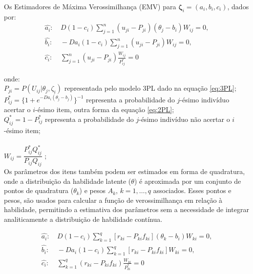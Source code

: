 Os Estimadores de Máxima Verossimilhança (EMV) para $ \boldsymbol{\zeta}_i = (a_i, b_i , c_i )$, dados por:\\


\[
\begin{aligned}
	\hat{a_i}: & \ D(1 - c_i)\sum_{j=1}^{n}(u_{ji} - P_{ji})(\theta_j - b_i)W_{ij} = 0, \\
	\hat{b_i}: & \ -Da_i(1 - c_i)\sum_{j=1}^{n}(u_{ji} - P_{ji})W_{ij} = 0, \\
	\hat{c_i}: & \ \sum_{j=1}^{n}(u_{ji} - P_{ji})\frac{W_{ij}}{P^*_{ij}} = 0
\end{aligned}
\]

\noindent onde:\\

\noindent $P_{ji} = P(U_{ij}|\theta_j,\zeta_i)$ representada pelo modelo 3PL dado na equação \ref{eq:3PL};\\

\noindent $P^*_{ij} = \{1 + e^{-Da_i(\theta_j - b_j)}\}^{-1} $ representa a probabilidade do $j$-ésimo indivíduo acertar o $i$-ésimo item, outra forma da equação \ref{eq:2PL};\\

\noindent $Q^*_{ij} = 1 - P^*_{ij} $ representa a probabilidade do $j$-ésimo indivíduo não acertar o $i$-ésimo item;\\
\\
\noindent $W_{ij} = \dfrac{P^*_{ij}Q^*_{ij}}{P_{ij}Q_{ij}} $ ;\\

Os parâmetros dos itens também podem ser estimados em forma de quadratura, onde a distribuição da habilidade latente ($\theta$) é aproximada por um conjunto de pontos de quadratura ($\theta_k$)  e pesos $A_k$, $k = 1, \dots, q$ associados. Esses pontos e pesos,  são usados para calcular a função de verossimilhança em relação à habilidade, permitindo a estimativa dos parâmetros sem a necessidade de integrar analiticamente a distribuição de habilidade contínua.

\[
\begin{aligned}
	\hat{a_i}: & \ D(1 - c_i)\sum_{k=1}^{q}[r_{ki} - P_{ki}f_{ki}](\theta_k - b_i)W_{ki} = 0, \\
	\hat{b_i}: & \ -Da_i(1 - c_i)\sum_{k=1}^{q}\left[r_{ki} - P_{ki}f_{ki}\right]W_{ki} = 0, \\
	\hat{c_i}: & \ \sum_{k=1}^{q}(r_{ki} - P_{ki}f_{ki})\frac{W_{ki}}{P^*_{ki}} = 0
\end{aligned}
\]



